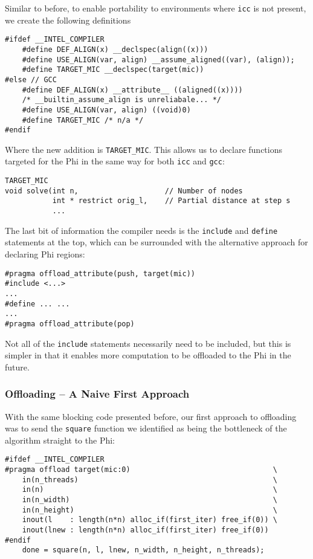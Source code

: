 \documentclass[11pt]{article}
\begin{document}
\noindent Similar to before, to enable portability to environments where \texttt{icc} is not present, we create the following definitions

\begin{lstlisting}
#ifdef __INTEL_COMPILER
    #define DEF_ALIGN(x) __declspec(align((x)))
    #define USE_ALIGN(var, align) __assume_aligned((var), (align));
    #define TARGET_MIC __declspec(target(mic))
#else // GCC
    #define DEF_ALIGN(x) __attribute__ ((aligned((x))))
    /* __builtin_assume_align is unreliabale... */
    #define USE_ALIGN(var, align) ((void)0)
    #define TARGET_MIC /* n/a */
#endif
\end{lstlisting}

\noindent Where the new addition is \texttt{TARGET\_MIC}.  This allows us to declare functions targeted for the Phi in the same way for both \texttt{icc} and \texttt{gcc}:

\begin{lstlisting}
TARGET_MIC
void solve(int n,                    // Number of nodes
           int * restrict orig_l,    // Partial distance at step s
           ...
\end{lstlisting}

\noindent The last bit of information the compiler needs is the \texttt{include} and \texttt{define} statements at the top, which can be surrounded with the alternative approach for declaring Phi regions:

\begin{lstlisting}
#pragma offload_attribute(push, target(mic))
#include <...>
...
#define ... ...
...
#pragma offload_attribute(pop)
\end{lstlisting}

\noindent Not all of the \texttt{include} statements necessarily need to be included, but this is simpler in that it enables more computation to be offloaded to the Phi in the future.

\subsubsection{Offloading -- A Naive First Approach}

\noindent With the same blocking code presented before, our first approach to offloading was to send the \texttt{square} function we identified as being the bottleneck of the algorithm straight to the Phi:

\begin{lstlisting}
#ifdef __INTEL_COMPILER
#pragma offload target(mic:0)                                 \
    in(n_threads)                                             \
    in(n)                                                     \
    in(n_width)                                               \
    in(n_height)                                              \
    inout(l    : length(n*n) alloc_if(first_iter) free_if(0)) \
    inout(lnew : length(n*n) alloc_if(first_iter) free_if(0))
#endif
    done = square(n, l, lnew, n_width, n_height, n_threads);
\end{lstlisting}
\end{document}
